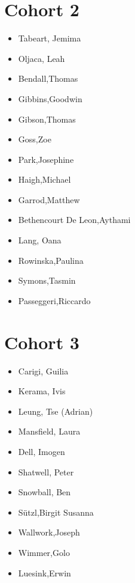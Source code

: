 \documentclass{article}
\begin{document}
\section*{Cohort 2}
\begin{itemize}
    \item Tabeart, Jemima \cite{tabeart2018conditioning, tabeart2020improving, tabeart2020impact}
    \item Oljaca, Leah \cite{oljaca2018almost}
    \item Bendall,Thomas \cite{bendall2020compatible, bendall2019recovered, bendall2019statistical}
    \item Gibbins,Goodwin \cite{gibbins2020entropy}
    \item Gibson,Thomas \cite{shipton2018higher, bendall2020compatible, gibson2020slate, gibson2019compatible, Gibson2019a, Gibson2019b, Gibson2019c, Gibson2019d}
    \item Goss,Zoe \cite{goss2020identifying,coles2021tidal}
    \item Park,Josephine
    \item Haigh,Michael \cite{haigh2018potential, haigh2020rossby}
    \item Garrod,Matthew \cite{garrod2018large}
    \item Bethencourt De Leon,Aythami \cite{de2020implications,alonso2020modelling,alonso2019burgers,alonso2020well}
    \item Lang, Oana
    \item Rowinska,Paulina \cite{everitt2020delayed}
    \item Symons,Tasmin 
    \item Passeggeri,Riccardo \cite{passeggeri2020spectral, passeggeri2019mixing, passeggeri2019limit, passeggeri2020signature}
\end{itemize}

\section*{Cohort 3}
\begin{itemize}
    \item Carigi, Guilia 
    \item Kerama, Ivis
    \item Leung, Tse (Adrian) \cite{leung2020impact, leung2019atmospheric}
    \item Mansfield, Laura \cite{mansfield2020predicting}
    \item Dell, Imogen
    \item Shatwell, Peter \cite{shatwell2020ocean}
    \item Snowball, Ben \cite{snowball2020sparse}
    \item Sützl,Birgit Susanna \cite{sutzl2020drag}
    \item Wallwork,Joseph \cite{wallwork2020goal}
    \item Wimmer,Golo \cite{wimmer2020energy}
    \item Luesink,Erwin \cite{geurts2019lyapunov, de2020implications}
\end{itemize}
\end{document}
